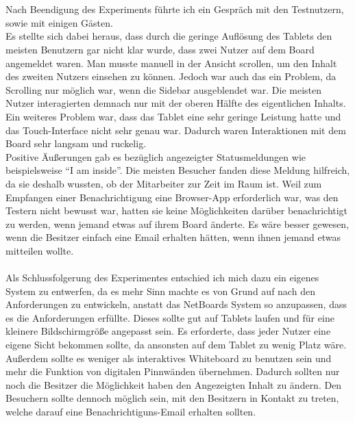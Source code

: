 \\
\\
Nach Beendigung des Experiments führte ich ein Gespräch mit den Testnutzern, sowie mit einigen Gästen.\\
Es stellte sich dabei heraus, dass durch die geringe Auflösung des Tablets den meisten Benutzern gar nicht klar wurde, dass zwei Nutzer auf dem Board angemeldet waren. Man musste manuell in der Ansicht scrollen, um den Inhalt des zweiten Nutzers einsehen zu können. Jedoch war auch das ein Problem, da Scrolling nur möglich war, wenn die Sidebar ausgeblendet war. Die meisten Nutzer interagierten demnach nur mit der oberen Hälfte des eigentlichen Inhalts.\\
Ein weiteres Problem war, dass das Tablet eine sehr geringe Leistung hatte und das Touch-Interface nicht sehr genau war. Dadurch waren Interaktionen mit dem Board sehr langsam und ruckelig.\\
Positive Äußerungen gab es bezüglich angezeigter Statusmeldungen wie beispielsweise ``I am inside''. Die meisten Besucher fanden diese Meldung hilfreich, da sie deshalb wussten, ob der Mitarbeiter zur Zeit im Raum ist.
Weil zum Empfangen einer Benachrichtigung eine Browser-App erforderlich war, was den Testern nicht bewusst war, hatten sie keine Möglichkeiten darüber benachrichtigt zu werden, wenn jemand etwas auf ihrem Board änderte. Es wäre besser gewesen, wenn die Besitzer einfach eine Email erhalten hätten, wenn ihnen jemand etwas mitteilen wollte.
\\
\\
Als Schlussfolgerung des Experimentes entschied ich mich dazu ein eigenes System zu entwerfen, da es mehr Sinn machte es von Grund auf nach den Anforderungen zu entwickeln, anstatt das NetBoards System so anzupassen, dass es die Anforderungen erfüllte.
Dieses sollte gut auf Tablets laufen und für eine kleinere Bildschirmgröße angepasst sein. Es erforderte, dass jeder Nutzer eine eigene Sicht bekommen sollte, da ansonsten auf dem Tablet zu wenig Platz wäre. Außerdem sollte es weniger als interaktives Whiteboard zu benutzen sein und mehr die Funktion von digitalen Pinnwänden übernehmen. Dadurch sollten nur noch die Besitzer die Möglichkeit haben den Angezeigten Inhalt zu ändern. Den Besuchern sollte dennoch möglich sein, mit den Besitzern in Kontakt zu treten, welche darauf eine Benachrichtiguns-Email erhalten sollten.